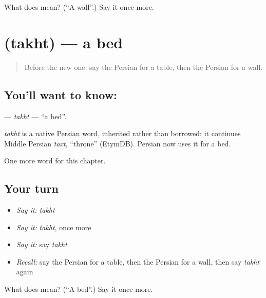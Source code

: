 \begin{tcolorbox}[breakable,colback=teal!4,colframe=teal!35!black,title={Before you move on}]
What does  mean? (\textquotedblleft{}A wall\textquotedblright{}.) Say it once more.
\end{tcolorbox}
\section[\texorpdfstring{\fa{تخت} (takht)}{تخت (takht)}]{ (takht) — a bed}

\label{lesson:FA-C46-takht}



\begin{quote}
Before the new one: say the Persian for a table, then the Persian for a wall.
\end{quote}

\subsection*{You'll want to know: }
\textbf{} — \emph{takht} — \textquotedblleft{}a bed\textquotedblright{}.

\begin{cousinweb}
\emph{takht} is a native Persian word, inherited rather than borrowed: it continues Middle Persian \emph{taxt}, \textquotedblleft{}throne\textquotedblright{} (EtymDB). Persian now uses it for a bed.
\end{cousinweb}

\begin{grammarlens}[title={What you've built}]
One more word for this chapter.
\end{grammarlens}

\subsection*{Your turn}
\begin{itemize}
\raggedright
  \item \emph{Say it:} \emph{takht}
  \item \emph{Say it:} \emph{takht}, once more
  \item \emph{Say it:} say \emph{takht}
  \item \emph{Recall:} say the Persian for a table, then the Persian for a wall, then say \emph{takht} again
\end{itemize}

\begin{tcolorbox}[breakable,colback=teal!4,colframe=teal!35!black,title={Before you move on}]
What does  mean? (\textquotedblleft{}A bed\textquotedblright{}.) Say it once more.
\end{tcolorbox}
